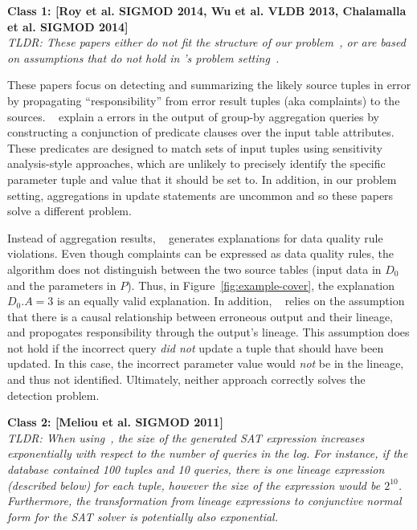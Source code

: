 \noindent \textbf{Class 1: [Roy et al. SIGMOD 2014, Wu et al. VLDB 2013, Chalamalla et al. SIGMOD 2014]} \\

{\it
TLDR: These papers either do not fit the structure of our problem~\cite{Wu13,roy2014formal}, or 
are based on assumptions that do not hold in \sys's problem setting~\cite{chalamalla2014}.
}


These papers focus on detecting and summarizing the likely source tuples in error by
propagating ``responsibility'' from error result tuples (aka complaints) to the sources.
~\cite{Wu13,roy2014formal} explain a errors in the output of group-by aggregation queries by constructing 
a conjunction of predicate clauses over the input table attributes. 
These predicates are designed to match sets of input tuples using sensitivity analysis-style approaches, which are unlikely to precisely identify the specific parameter tuple and value that it should be set to.
In addition, in our problem setting, aggregations in update statements are uncommon and so these papers solve a different problem.

Instead of aggregation results, ~\cite{chalamalla2014} generates explanations for data quality rule violations. 
Even though complaints can be expressed as data quality rules, the algorithm does not distinguish between the two source tables (input data in $D_0$ and the parameters in $P$).
Thus, in Figure~\ref{fig:example-cover}, the explanation $D_0.A = 3$ is an equally valid explanation. 
In addition, ~\cite{chalamalla2014} relies on the assumption that there is a causal relationship between erroneous output and their lineage, and propogates responsibility through the output's lineage.
This assumption does not hold if the incorrect query {\it did not} update a tuple that should have been updated.  In this case, the incorrect parameter value would {\it not} be in the lineage, and thus not identified. Ultimately, neither approach correctly solves the detection problem.

\noindent \textbf{Class 2: [Meliou et al. SIGMOD 2011]} \\

{\it TLDR: When using~\cite{meliou2011tracing}, the size of the generated SAT expression 
increases exponentially with respect to the number of queries in the log. 
For instance, if the database contained 100 tuples and 10 queries, there is one lineage expression (described below) for each tuple, 
however the size of the expression would be $2^{10}$.  
Furthermore, the transformation from lineage expressions to conjunctive normal form for the SAT solver is potentially also exponential. 
}

